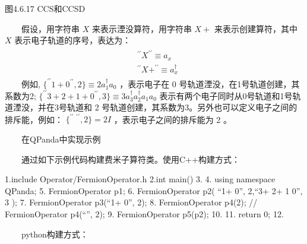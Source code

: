 \documentclass[a4paper,11pt,english]{sphinxmanual}
\begin{document}
\begin{center}图4.6.17 CCS和CCSD
\end{center}
\sphinxAtStartPar
{}

\sphinxAtStartPar
  假设，用字符串 \(X\) 来表示湮没算符，用字符串 \(X+\) 来表示创建算符，其中 \(X\) 表示电子轨道的序号，表达为：
\begin{equation*}
\begin{split}\begin{aligned} &{ }^{\prime \prime} X^{\prime \prime} \equiv a_{x} \\ &{ }^{\prime \prime} X+^{\prime \prime} \equiv a_{x}^{\dagger} \end{aligned}\end{split}
\end{equation*}
\sphinxAtStartPar
  例如,  \(\{^{\prime \prime} 1+0^{\prime \prime}, 2\} \equiv 2 a_{1}^{\dagger} a_{0}\)  ，表示电子在 0 号轨道湮没，在1号轨道创建，其系数为2;  \(\{^{\prime \prime}3+2+1+0^{\prime \prime}, 3\} \equiv 3 a_{3}^{\dagger} a_{2}^{\dagger} a_{1} a_{0}\)  表示有两个电子同时从0号轨道和1号轨道湮没，并在3号轨道和 2 号轨道创建，其系数为3。另外也可以定义电子之间的排斥能，例如：  \(\{^{\prime \prime\ \ \prime\prime}, 2\}=2 I\) ，表示电子之间的排斥能为 2 。

\sphinxAtStartPar
  在QPanda中实现示例

\sphinxAtStartPar
  通过如下示例代码构建费米子算符类。使用C++构建方式：

\begin{sphinxVerbatim}[commandchars=\\\{\}]
1.\PYGZsh{}include \PYGZdq{}Operator/FermionOperator.h\PYGZdq{}
2.int main()
3.\PYGZob{}
4.    using namespace QPanda;
5.    FermionOperator p1;
6.    FermionOperator p2(\PYGZob{} \PYGZob{}“1+  0”, 2\PYGZcb{},\PYGZob{}“3+ 2+  1 0”, 3\PYGZcb{} \PYGZcb{});
7.    FermionOperator p3(“1+ 0”, 2);
8.    FermionOperator p4(2); // FermionOperator p4(“”, 2);
9.    FermionOperator p5(p2);
10.
11.    return 0;
12.\PYGZcb{}
\end{sphinxVerbatim}

\sphinxAtStartPar
  python构建方式：
\end{document}
